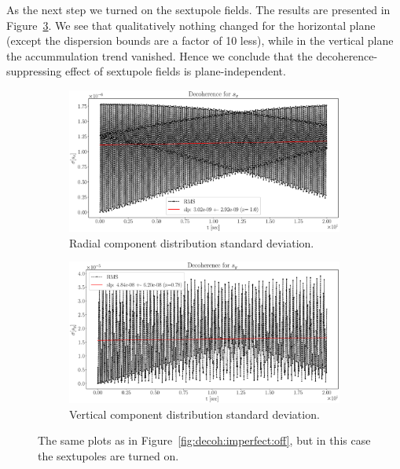 \documentclass[preprint, review]{elsarticle}
\begin{document}
As the next step we turned on the sextupole fields.
The results are presented in Figure~\ref{fig:decoh:imperfect:on}.
We see that qualitatively nothing changed for the horizontal plane (except the dispersion bounds are
a factor of 10 less), while in the vertical plane the accummulation trend vanished. Hence we conclude
that the decoherence-suppressing effect of sextupole fields is plane-independent.
\begin{figure}[h]\centering
  \begin{subfigure}{\linewidth}
    \includegraphics[width=\linewidth]{img/decoh/SX_decoh_20sec_opt.eps}
      \caption{Radial component distribution standard deviation.\label{fig:decoh:imperfect:on:hor}}
  \end{subfigure}
  \begin{subfigure}{\linewidth}
    \includegraphics[width=\linewidth]{img/decoh/SY_decoh_20sec_opt.eps}
    \caption{Vertical component distribution standard deviation.\label{fig:decoh:imperfect:on:vert}}
  \end{subfigure}
  \caption{The same plots as in Figure~\ref{fig:decoh:imperfect:off}, but in this case the
    sextupoles are turned on.\label{fig:decoh:imperfect:on}}
\end{figure}
\end{document}
